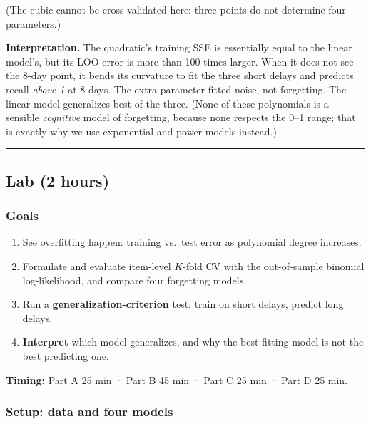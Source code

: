 (The cubic cannot be cross-validated here: three points do not determine
four parameters.)

\textbf{Interpretation.} The quadratic's training SSE is essentially
equal to the linear model's, but its LOO error is more than 100 times
larger. When it does not see the 8-day point, it bends its curvature to
fit the three short delays and predicts recall \emph{above 1} at 8 days.
The extra parameter fitted noise, not forgetting. The linear model
generalizes best of the three. (None of these polynomials is a sensible
\emph{cognitive} model of forgetting, because none respects the 0--1
range; that is exactly why we use exponential and power models instead.)

\begin{center}\rule{0.5\linewidth}{0.5pt}\end{center}


\subsection{Lab (2 hours)}

\subsubsection{Goals}

\begin{enumerate}
\def\labelenumi{\arabic{enumi}.}
\tightlist
\item
  See overfitting happen: training vs.~test error as polynomial degree
  increases.
\item
  Formulate and evaluate item-level \(K\)-fold CV with the out-of-sample binomial
  log-likelihood, and compare four forgetting models.
\item
  Run a \textbf{generalization-criterion} test: train on short delays,
  predict long delays.
\item
  \textbf{Interpret} which model generalizes, and why the best-fitting
  model is not the best predicting one.
\end{enumerate}

\textbf{Timing:} Part A 25 min · Part B 45 min · Part C 25 min · Part D
25 min.

\subsubsection{Setup: data and four models}

